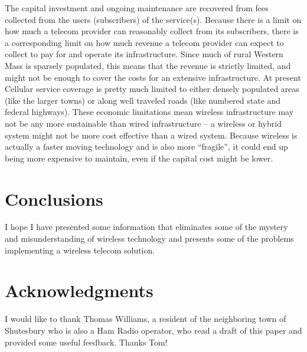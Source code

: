 \documentclass[12pt]{article}
\begin{document}
The capital investment and ongoing maintenance are recovered from fees
collected from the users (subscribers) of the service(s). Because there is a
limit on how much a telecom provider can reasonably collect from its
subscribers, there is a corresponding limit on how much revenue a telecom
provider can expect to collect to pay for and operate its infrastructure.
Since much of rural Western Mass is sparsely populated, this means that the
revenue is strictly limited, and might not be enough to cover the costs for an
extensive infrastructure. At present Cellular service coverage is pretty much
limited to either densely populated areas (like the larger towns) or along
well traveled roads (like numbered state and federal highways). These economic
limitations mean wireless infrastructure may not be any more sustainable than
wired infrastructure -- a wireless or hybrid system might not be more cost
effective than a wired system. Because wireless is actually a faster moving
technology and is also more ``fragile'', it could end up being more expensive
to maintain, even if the capital cost might be lower. 

\section{Conclusions}

I hope I have presented some information that eliminates some of the mystery 
and misunderstanding of wireless technology and presents some of the problems 
implementing a wireless telecom solution.


\appendix
\clearpage
{}



\clearpage
{}
\section*{Acknowledgments}

I would like to thank Thomas Williams, a resident of the neighboring town of
Shutesbury who is also a Ham Radio operator, who read a draft of this paper and
provided some useful feedback.  Thanks Tom!
\end{document}
